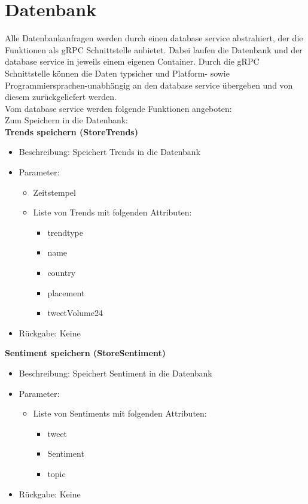 \documentclass[conference]{IEEEtran}
\begin{document}
\section{Datenbank}
Alle Datenbankanfragen werden durch einen database service abstrahiert, der die Funktionen als gRPC
Schnittstelle anbietet. Dabei laufen die Datenbank und der database service in jeweils einem eigenen Container.
Durch die gRPC Schnittstelle können die Daten typsicher und Platform- sowie Programmiersprachen-unabhängig
an den database service übergeben und von diesem zurückgeliefert werden.
\\
Vom database service werden folgende Funktionen angeboten:
\\
Zum Speichern in die Datenbank:
\\
\smallskip
\textbf{Trends speichern (StoreTrends)}
\begin{itemize}
    \item Beschreibung: Speichert Trends in die Datenbank
    \item Parameter:
          \begin{itemize}
              \item Zeitstempel
              \item Liste von Trends mit folgenden Attributen:
                    \begin{itemize}
                        \item trendtype
                        \item name
                        \item country
                        \item placement
                        \item tweetVolume24
                    \end{itemize}
          \end{itemize}
    \item Rückgabe: Keine
\end{itemize}

\smallskip
\textbf{Sentiment speichern (StoreSentiment)}
\begin{itemize}
    \item Beschreibung: Speichert Sentiment in die Datenbank
    \item Parameter:
          \begin{itemize}
              \item Liste von Sentiments mit folgenden Attributen:
                    \begin{itemize}
                        \item tweet
                        \item Sentiment
                        \item topic
                    \end{itemize}
          \end{itemize}
    \item Rückgabe: Keine
\end{itemize}
\end{document}
